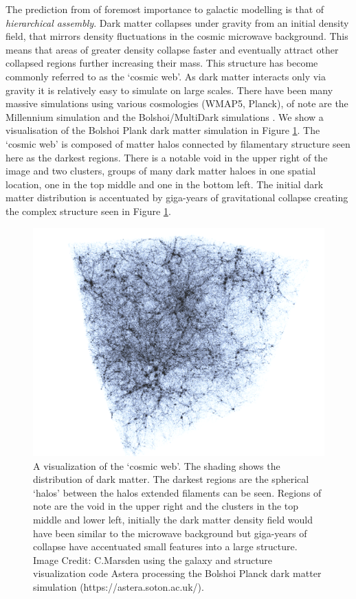 The prediction from \LCDM of foremost importance to galactic modelling is that of \textit{hierarchical assembly}. Dark matter collapses under gravity from an initial density field, that mirrors density fluctuations in the cosmic microwave background. This means that areas of greater density collapse faster and eventually attract other collapsed regions further increasing their mass. This structure has become commonly referred to as the `cosmic web'. As dark matter interacts only via gravity it is relatively easy to simulate on large scales. There have been many massive \LCDM simulations using various cosmologies (WMAP5, Planck), of note are the Millennium simulation \citep{Boylan-Kolchin2009ResolvingSimulation} and the Bolshoi/MultiDark simulations \citep{Klypin2016}. We show a visualisation of the Bolshoi Plank dark matter simulation in Figure \ref{fig:DMStruct}. The `cosmic web' is composed of matter halos connected by filamentary structure seen here as the darkest regions. There is a notable void in the upper right of the image and two clusters, groups of many dark matter haloes in one spatial location, one in the top middle and one in the bottom left. The initial dark matter distribution is accentuated by giga-years of gravitational collapse creating the complex structure seen in Figure \ref{fig:DMStruct}.

\begin{figure}[ht]
    \centering
    \includegraphics[width = \linewidth]{Figures/Chapter1/DMStruct.png}
    \caption{A visualization of the `cosmic web'. The shading shows the distribution of dark matter. The darkest regions are the spherical `halos' between the halos extended filaments can be seen. Regions of note are the void in the upper right and the clusters in the top middle and lower left, initially the dark matter density field would have been similar to the microwave background but giga-years of collapse have accentuated small features into a large structure. Image Credit: C.Marsden using the galaxy and structure visualization code Astera processing the Bolshoi Planck dark matter simulation (https://astera.soton.ac.uk/).}
    \label{fig:DMStruct}
\end{figure}

